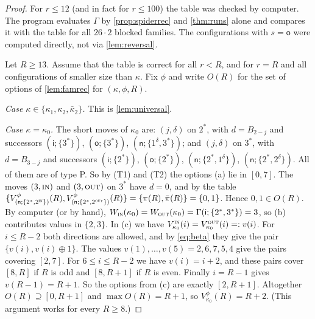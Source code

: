 \documentclass[11pt]{amsart}
\theoremstyle{definition}
\theoremstyle{remark}
\newcommand{\sn}{\mathsf{n}}
\newcommand{\si}{\mathsf{i}}
\newcommand{\so}{\mathsf{o}}
\newcommand{\free}{\ast}
\newcommand{\IN}{\textup{\textsc{in}}}
\newcommand{\OUT}{\textup{\textsc{out}}}
\begin{document}
\begin{proof}
For $r\le 12$ (and in fact for $r\le100$) the table was checked by computer. The program evaluates $\Gamma$ by \cref{prop:spiderrec} and \cref{thm:runs} alone and compares it with the table for all $26\cdot2$ blocked families. The configurations with $s=\so$ were computed directly, not via \cref{lem:reversal}.

Let $R\ge13$. Assume that the table is correct for all $r<R$, and for $r=R$ and all configurations of smaller size than $\kappa$. Fix $\phi$ and write $O(R)$ for the set of options of \cref{lem:famrec} for $(\kappa,\phi,R)$.

\emph{Case $\kappa\in\{\kappa_1,\kappa_2,\bar\kappa_2\}$.} This is \cref{lem:universal}.

\emph{Case $\kappa=\kappa_0$.} The short moves of $\kappa_0$ are: $(j,\delta)$ on $2^\free$, with $d=B_{2-j}$ and successors $(\si;\{3^\free\})$, $(\so;\{3^\free\})$, $(\sn;\{1^\delta,3^\free\})$; and $(j,\delta)$ on $3^\free$, with $d=B_{3-j}$ and successors $(\si;\{2^\free\})$, $(\so;\{2^\free\})$, $(\sn;\{2^\free,1^\delta\})$, $(\sn;\{2^\free,2^\delta\})$. All of them are of type P. So by (T1) and (T2) the options (a) lie in $[0,7]$. The moves $(3,\IN)$ and $(3,\OUT)$ on $3^\free$ have $d=0$, and by the table $\{V^\phi_{(\sn;\{2^\free,2^\IN\})}(R),V^\phi_{(\sn;\{2^\free,2^\OUT\})}(R)\}=\{\pi(R),\bar\pi(R)\}=\{0,1\}$. Hence $0,1\in O(R)$. By computer (or by hand), $W_\IN(\kappa_0)=W_\OUT(\kappa_0)=\Gamma(\si;\{2^\free,3^\free\})=3$, so (b) contributes values in $\{2,3\}$. In (c) we have $V^\IN_{\kappa_0}(i)=V^\OUT_{\kappa_0}(i)=:v(i)$. For $i\le R-2$ both directions are allowed, and by \eqref{eq:beta} they give the pair $\{v(i),v(i)\oplus1\}$. The values $v(1),\dots,v(5)=2,6,7,5,4$ give the pairs covering $[2,7]$. For $6\le i\le R-2$ we have $v(i)=i+2$, and these pairs cover $[8,R]$ if $R$ is odd and $[8,R+1]$ if $R$ is even. Finally $i=R-1$ gives $v(R-1)=R+1$. So the options from (c) are exactly $[2,R+1]$. Altogether $O(R)\supseteq[0,R+1]$ and $\max O(R)=R+1$, so $V^\phi_{\kappa_0}(R)=R+2$. (This argument works for every $R\ge8$.)


\end{proof}
\end{document}
